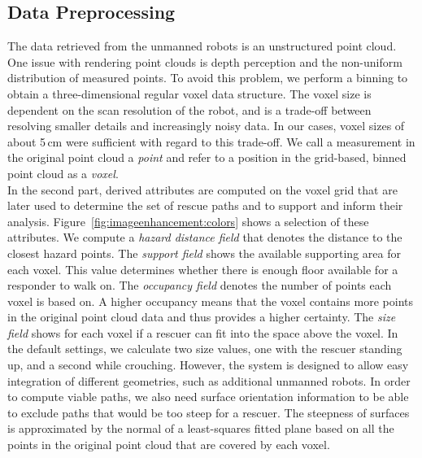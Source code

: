 \documentclass{egpubl}
\begin{document}
\subsection{Data Preprocessing} \label{sec:overview:preprocessing}
The data retrieved from the unmanned robots is an unstructured point cloud. One issue with rendering point clouds is depth perception and the non-uniform distribution of measured points. To avoid this problem, we perform a binning to obtain a three-dimensional regular voxel data structure. The voxel size is dependent on the scan resolution of the robot, and is a trade-off between resolving smaller details and increasingly noisy data. In our cases, voxel sizes of about 5\,cm were sufficient with regard to this trade-off. We call a measurement in the original point cloud a \emph{point} and refer to a position in the grid-based, binned point cloud as a \emph{voxel}.\\
%
 In the second part, derived attributes are computed on the voxel grid that are later used to determine the set of rescue paths and to support and inform their analysis. Figure~\ref{fig:imageenhancement:colors} shows a selection of these attributes. We compute a \emph{hazard distance field} that denotes the distance to the closest hazard points. The \emph{support field} shows the available supporting area for each voxel. This value determines whether there is enough floor available for a responder to walk on. The \emph{occupancy field} denotes the number of points each voxel is based on. A higher occupancy means that the voxel contains more points in the original point cloud data and thus provides a higher certainty. The \emph{size field} shows for each voxel if a rescuer can fit into the space above the voxel. In the default settings, we calculate two size values, one with the rescuer standing up, and a second while crouching. However, the system is designed to allow easy integration of different geometries, such as additional unmanned robots. In order to compute viable paths, we also need surface orientation information to be able to exclude paths that would be too steep for a rescuer. The steepness of surfaces is approximated by the normal of a least-squares fitted plane based on all the points in the original point cloud that are covered by each voxel.
\end{document}
